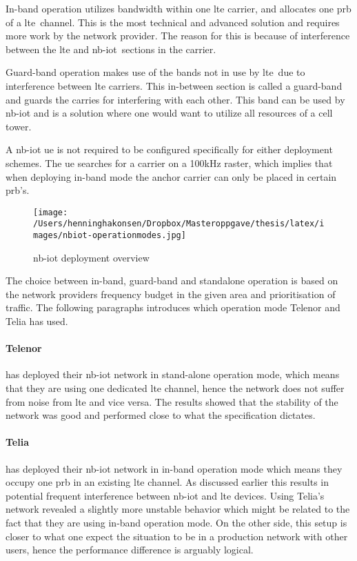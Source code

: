\documentclass[USenglish]{ifimaster}  %
\begin{document}
In-band operation utilizes bandwidth within one \acrshort{lte} carrier, and allocates one \acrfull{prb} of a \acrshort{lte} channel. This is the most technical and advanced solution and requires more work by the network provider. The reason for this is because of interference between the \acrshort{lte} and \acrshort{nb-iot} sections in the carrier.

Guard-band operation makes use of the bands not in use by \acrshort{lte} due to interference between \acrshort{lte} carriers. This in-between section is called a guard-band and guards the carries for interfering with each other. This band can be used by \acrshort{nb-iot} and is a solution where one would want to utilize all resources of a cell tower.

A \acrshort{nb-iot} \acrshort{ue} is not required to be configured specifically for either deployment schemes. The \acrshort{ue} searches for a carrier on a 100kHz raster, which implies that when deploying in-band mode the anchor carrier can only be placed in certain \acrshort{prb}'s\cite{APrimero97:online}.

\begin{figure}[ht]
  \centering\texttt{[image: /Users/henninghakonsen/Dropbox/Masteroppgave/thesis/latex/images/nbiot-operationmodes.jpg]}
  \caption[\acrshort{nb-iot} deployment overview]{\acrshort{nb-iot} deployment overview \cite{online:legacyWire}}
  \label{figure:nbiot-operationmodes}
\end{figure}

The choice between in-band, guard-band and standalone operation is based on the network providers frequency budget in the given area and prioritisation of traffic. The following paragraphs introduces which operation mode Telenor and Telia has used.

\paragraph{Telenor} has deployed their \acrshort{nb-iot} network in stand-alone operation mode, which means that they are using one dedicated \acrshort{lte} channel\cite{person:ola}, hence the network does not suffer from noise from \acrshort{lte} and vice versa. The results showed that the stability of the network was good and performed close to what the specification dictates.

\paragraph{Telia} has deployed their \acrshort{nb-iot} network in in-band operation mode which means they occupy one \acrshort{prb} in an existing \acrshort{lte} channel. As discussed earlier this results in potential frequent interference between \acrshort{nb-iot} and \acrshort{lte} devices. Using Telia's network revealed a slightly more unstable behavior which might be related to the fact that they are using in-band operation mode. On the other side, this setup is closer to what one expect the situation to be in a production network with other users, hence the performance difference is arguably logical.
\end{document}
